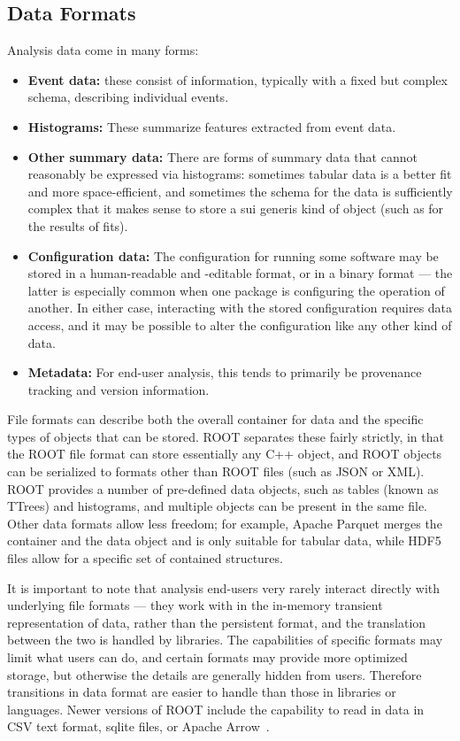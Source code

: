 \subsection{Data Formats}
Analysis data come in many forms:
\begin{itemize}
\item \textbf{Event data:} these consist of information, typically with a fixed but complex schema, describing individual events.
\item \textbf{Histograms:} These summarize features extracted from event data.
\item \textbf{Other summary data:} There are forms of summary data that cannot reasonably be expressed via histograms: sometimes tabular data is a better fit and more space-efficient, and sometimes the schema for the data is sufficiently complex that it makes sense to store a sui generis kind of object (such as for the results of fits).
\item \textbf{Configuration data:} The configuration for running some software may be stored in a human-readable and -editable format, or in a binary format --- the latter is especially common when one package is configuring the operation of another. In either case, interacting with the stored configuration requires data access, and it may be possible to alter the configuration like any other kind of data. 
\item \textbf{Metadata:} For end-user analysis, this tends to primarily be provenance tracking and version information.
\end{itemize}

File formats can describe both the overall container for data and the specific types of objects that can be stored. ROOT separates these fairly strictly, in that the ROOT file format can store essentially any C++ object, and ROOT objects can be serialized to formats other than ROOT files (such as JSON or XML). ROOT provides a number of pre-defined data objects, such as tables (known as TTrees) and histograms, and multiple objects can be present in the same file. Other data formats allow less freedom; for example, Apache Parquet merges the container and the data object and is only suitable for tabular data, while HDF5 files allow for a specific set of contained structures.

It is important to note that analysis end-users very rarely interact directly with underlying file formats --- they work with in the in-memory transient representation of data, rather than the persistent format, and the translation between the two is handled by libraries. The capabilities of specific formats may limit what users can do, and certain formats may provide more optimized storage, but otherwise the details are generally hidden from users. Therefore transitions in data format are easier to handle than those in libraries or languages. Newer versions of ROOT include the capability to read in data in CSV text format, sqlite files, or Apache Arrow~\cite{Arrow}.

